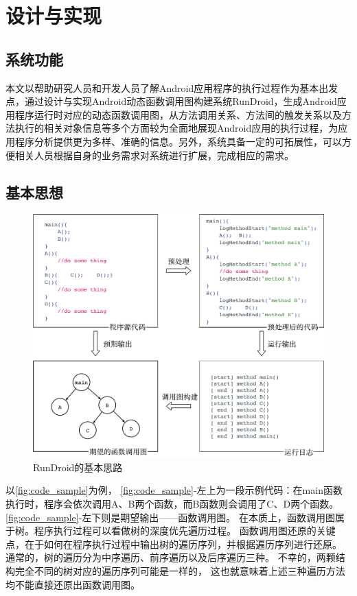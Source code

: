 \chapter{设计与实现 }
\label{chp:implement}

\section{系统功能}
本文以帮助研究人员和开发人员了解Android应用程序的执行过程作为基本出发点，通过设计与实现Android动态函数调用图构建系统RunDroid，生成Android应用程序运行时对应的动态函数调用图，从方法调用关系、方法间的触发关系以及方法执行的相关对象信息等多个方面较为全面地展现Android应用的执行过程，为应用程序分析提供更为多样、准确的信息。另外，系统具备一定的可拓展性，可以方便相关人员根据自身的业务需求对系统进行扩展，完成相应的需求。

\section{基本思想}



\begin{figure}[ht]
	\centering
	\includegraphics[width=\textwidth]{./Figures/code-sample.png}
	\caption{RunDroid的基本思路}
	\label{fig:code_sample}
\end{figure}


以\autoref{fig:code_sample}为例，%
\autoref{fig:code_sample}-左上为一段示例代码：在main函数执行时，程序会依次调用A、B两个函数，而B函数则会调用了C、D两个函数。
\autoref{fig:code_sample}-左下则是期望输出——函数调用图。
在本质上，函数调用图属于树。程序执行过程可以看做树的深度优先遍历过程。
函数调用图还原的关键点，在于如何在程序执行过程中输出树的遍历序列，并根据遍历序列进行还原。
通常的，树的遍历分为中序遍历、前序遍历以及后序遍历三种。
不幸的，两颗结构完全不同的树对应的遍历序列可能是一样的，
这也就意味着上述三种遍历方法均不能直接还原出函数调用图。

